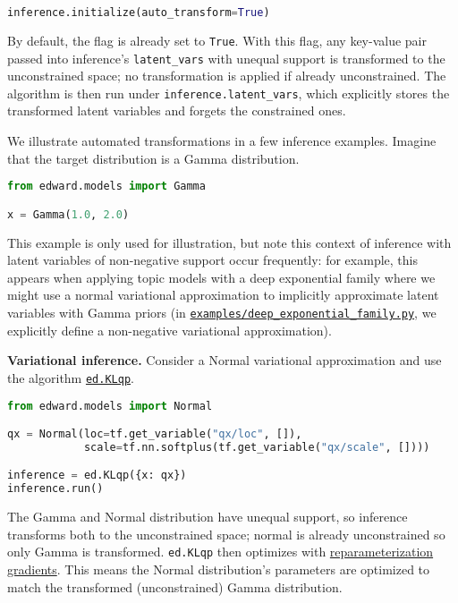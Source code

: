 \begin{lstlisting}[language=Python]
inference.initialize(auto_transform=True)
\end{lstlisting}

By default, the flag is already set to \texttt{True}.
With this flag, any key-value pair passed into inference's
\texttt{latent\_vars} with unequal support is transformed to the
unconstrained space; no transformation is applied if already
unconstrained. The algorithm is then run under
\texttt{inference.latent\_vars}, which explicitly stores the
transformed latent variables and forgets the constrained ones.

We illustrate automated transformations in a few inference examples.
Imagine that the target distribution is a Gamma distribution.

\begin{lstlisting}[language=Python]
from edward.models import Gamma

x = Gamma(1.0, 2.0)
\end{lstlisting}

This example is only used for illustration, but note this context of
inference with latent variables of non-negative support occur
frequently: for example, this appears when applying topic models with a deep exponential
family where we might use a normal variational
approximation to implicitly approximate latent variables with Gamma
priors (in
\href{https://github.com/blei-lab/edward/blob/master/examples/deep_exponential_family.py}
{\texttt{examples/deep\_exponential\_family.py}},
we explicitly define a non-negative variational approximation).

\textbf{Variational inference.}
Consider a Normal variational approximation
and use the algorithm \href{/api/ed/KLqp}{\texttt{ed.KLqp}}.

\begin{lstlisting}[language=Python]
from edward.models import Normal

qx = Normal(loc=tf.get_variable("qx/loc", []),
            scale=tf.nn.softplus(tf.get_variable("qx/scale", [])))

inference = ed.KLqp({x: qx})
inference.run()
\end{lstlisting}

The Gamma and Normal distribution have unequal support, so inference
transforms both to the unconstrained space; normal is already
unconstrained so only Gamma is transformed. \texttt{ed.KLqp} then
optimizes with
\href{/api/klqp}{reparameterization gradients}.
This means the Normal distribution's parameters are optimized to match
the transformed (unconstrained) Gamma distribution.

